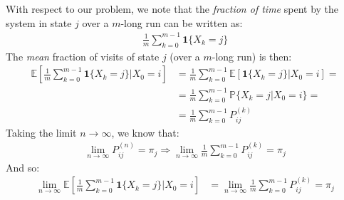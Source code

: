 \documentclass[../template.tex]{subfiles}
\begin{document}
With respect to our problem, we note that the \textit{fraction of time} spent by the system in state $j$ over a $m$-long run can be written as:
\begin{align*}
    \frac{1}{m} \sum_{k=0}^{m-1} \textbf{1}\{X_k = j\} 
\end{align*} 
The \textit{mean} fraction of visits of state $j$ (over a $m$-long run) is then:
\begin{align*}
    \mathbb{E}\left[\frac{1}{m} \sum_{k=0}^{m-1} \textbf{1}\{X_k = j\} |X_0 = i  \right] &= \frac{1}{m} \sum_{k=0}^{m-1} \mathbb{E}[\textbf{1}\{X_k = j\}|X_0 = i ] =\\
    &= \frac{1}{m} \sum_{k=0}^{m-1} \mathbb{P}\{X_k = j|X_0 = i\} =\\
    &= \frac{1}{m} \sum_{k=0}^{m-1} P_{ij}^{(k)}  
\end{align*} 
Taking the limit $n \to \infty$, we know that:
\begin{align*}
    \lim_{n \to \infty} P_{ij}^{(n)} = \pi_j \Rightarrow \lim_{n \to \infty} \frac{1}{m} \sum_{k=0}^{m-1} P_{ij}^{(k)} = \pi_j
\end{align*}
And so:
\begin{align*}
    \lim_{n \to \infty} \mathbb{E}\left[\frac{1}{m} \sum_{k=0}^{m-1} \textbf{1}\{X_k = j\} |X_0 = i  \right] &= \lim_{n \to \infty} \frac{1}{m} \sum_{k=0}^{m-1} P_{ij}^{(k)} = \pi_j
\end{align*}
\end{document}
